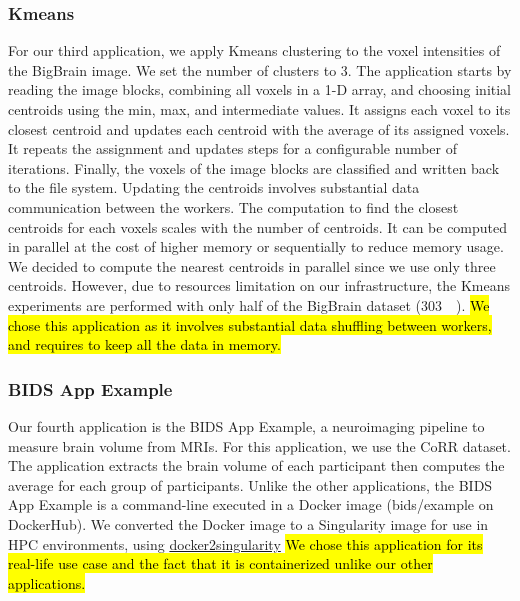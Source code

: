 \documentclass[AMA,STIX1COL]{WileyNJD-v2}
\newcommand{\HL}[1]{\hl{#1}}
\begin{document}
\subsubsection{Kmeans}
For our third application, we apply Kmeans clustering to the voxel
intensities of the BigBrain image. We set the number of clusters to 3. The
application starts by reading the image blocks, combining all voxels in a
1-D array, and choosing initial centroids using the min, max, and
intermediate values. It assigns each voxel to its closest centroid and
updates each centroid with the average of its assigned voxels. It repeats
the assignment and updates steps for a configurable number of iterations.
Finally, the voxels of the image blocks are classified and written back to
the file system. Updating the centroids involves substantial data
communication between the workers.
The computation to find the closest centroids for each voxels scales with the number of centroids.
It can be computed in parallel at the cost of higher memory or sequentially to reduce memory usage.
We decided to compute the nearest centroids in parallel since we use only three centroids.
However, due to resources limitation on our infrastructure, the Kmeans experiments
are performed with only half of the BigBrain dataset ({\SI{303}{\gibi\byte}}).
\HL{We chose this application as it involves substantial data shuffling between workers,
and requires to keep all the data in memory.}
								
\subsubsection{BIDS App Example}
Our fourth application is the BIDS App Example, a neuroimaging pipeline to
measure brain volume from MRIs. For this application, we use the CoRR
dataset. The application extracts the brain volume of each participant
then computes the average for each group of participants. Unlike the other
applications, the BIDS App Example is a command-line executed in a Docker image
(bids/example on DockerHub). We converted the Docker image to a Singularity
image for use in HPC environments, using
\href{https://hub.docker.com/r/singularityware/docker2singularity/tags/}{docker2singularity}
\HL{We chose this application for its real-life use case and the fact that it is containerized unlike our other applications.}
										
\end{document}
